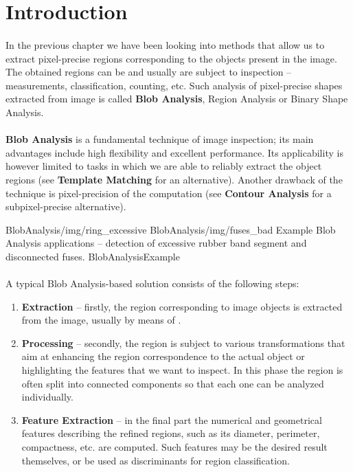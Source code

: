 \section{Introduction}

\paragraph*{}
In the previous chapter we have been looking into methods that allow us to extract pixel-precise regions corresponding to the objects present in the image. The obtained regions can be and usually are subject to inspection -- measurements, classification, counting, etc. Such analysis of pixel-precise shapes extracted from image is called \textbf{Blob Analysis}, Region Analysis or Binary Shape Analysis.

\paragraph*{}
\textbf{Blob Analysis} is a fundamental technique of image inspection; its main advantages include high flexibility and excellent performance. Its applicability is however limited to tasks in which we are able to reliably extract the object regions (see \textbf{Template Matching} for an alternative). Another drawback of the technique is pixel-precision of the computation (see \textbf{Contour Analysis} for a subpixel-precise alternative).

\twoFigures
{BlobAnalysis/img/ring_excessive}
{BlobAnalysis/img/fuses_bad}
{Example Blob Analysis applications -- detection of excessive rubber band segment and disconnected fuses.}
{BlobAnalysisExample}
{\basicWidth}

\paragraph*{}
A typical Blob Analysis-based solution consists of the following steps:
\begin{enumerate}
	\item \textbf{Extraction} -- firstly, the region corresponding to image objects is extracted from the image, usually by means of .
	\item \textbf{Processing} -- secondly, the region is subject to various transformations that aim at enhancing the region correspondence to the actual object or highlighting the features that we want to inspect. In this phase the region is often split into connected components so that each one can be analyzed individually.
	\item \textbf{Feature Extraction} -- in the final part the numerical and geometrical features describing the refined regions, such as its diameter, perimeter, compactness, etc. are computed. Such features may be the desired result themselves, or be used as discriminants for region classification.
\end{enumerate}

